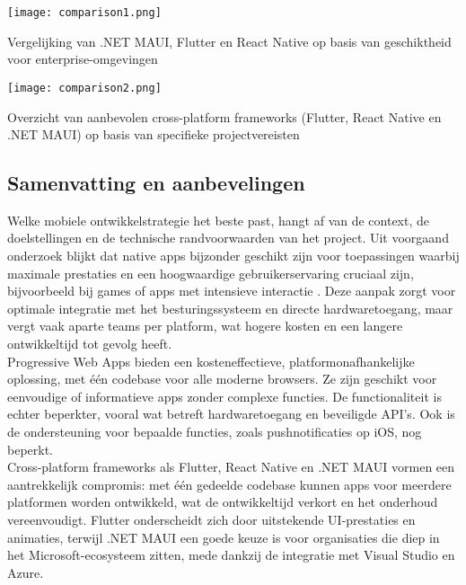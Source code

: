 \begin{table}[h]
    \centering
    \texttt{[image: comparison1.png]}
    \caption[Integratie]{Vergelijking van .NET MAUI, Flutter en React Native op basis van geschiktheid voor enterprise-omgevingen \autocite{Gajjam2025}}
    \label{fig:vergelijking}
\end{table}

\begin{table}[h]
    \centering
    \texttt{[image: comparison2.png]}
    \caption[Frameworkkeuze]{Overzicht van aanbevolen cross-platform frameworks (Flutter, React Native en .NET MAUI) op basis van specifieke projectvereisten \autocite{Gajjam2025}}
    \label{tab:frameworkkeuze}
\end{table}

\subsection{Samenvatting en aanbevelingen}
Welke mobiele ontwikkelstrategie het beste past, hangt af van de context, de doelstellingen en de technische randvoorwaarden van het project. Uit voorgaand onderzoek blijkt dat native apps bijzonder geschikt zijn voor toepassingen waarbij maximale prestaties en een hoogwaardige gebruikerservaring cruciaal zijn, bijvoorbeeld bij games of apps met intensieve interactie \autocite{Singh2024, Gillis2022}. Deze aanpak zorgt voor optimale integratie met het besturingssysteem en directe hardwaretoegang, maar vergt vaak aparte teams per platform, wat hogere kosten en een langere ontwikkeltijd tot gevolg heeft.\\

Progressive Web Apps bieden een kosteneffectieve, platformonafhankelijke oplossing, met één codebase voor alle moderne browsers. Ze zijn geschikt voor eenvoudige of informatieve apps zonder complexe functies. De functionaliteit is echter beperkter, vooral wat betreft hardwaretoegang en beveiligde API’s. Ook is de ondersteuning voor bepaalde functies, zoals pushnotificaties op iOS, nog beperkt.\\

Cross-platform frameworks als Flutter, React Native en .NET MAUI vormen een aantrekkelijk compromis: met één gedeelde codebase kunnen apps voor meerdere platformen worden ontwikkeld, wat de ontwikkeltijd verkort en het onderhoud vereenvoudigt. Flutter onderscheidt zich door uitstekende UI-prestaties en animaties, terwijl .NET MAUI een goede keuze is voor organisaties die diep in het Microsoft-ecosysteem zitten, mede dankzij de integratie met Visual Studio en Azure.\\


